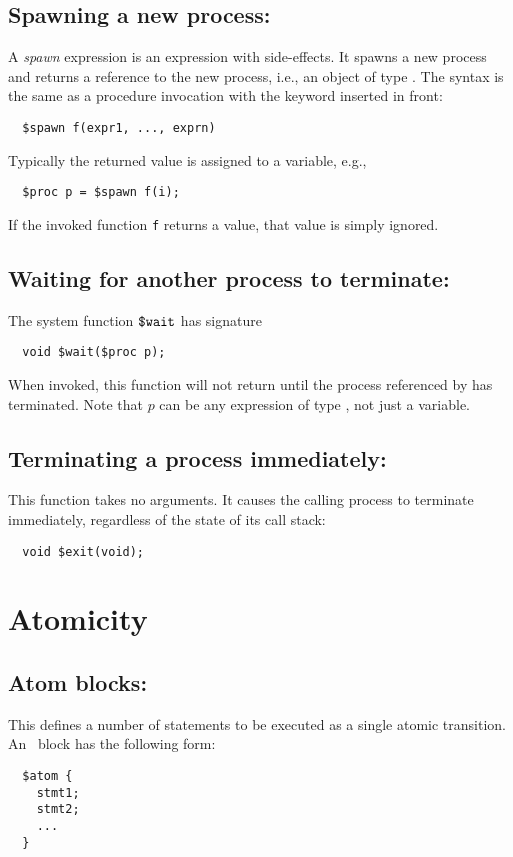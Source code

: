 \subsection{Spawning a new process: \cspawn}

A \emph{spawn} expression is an expression with side-effects.  It
spawns a new process and returns a reference to the new process, i.e.,
an object of type \cproc.  The syntax is the same as a procedure
invocation with the keyword \cspawn{} inserted in front:
\begin{verbatim}
  $spawn f(expr1, ..., exprn)
\end{verbatim}
Typically the returned value is assigned to a variable, e.g.,
\begin{verbatim}
  $proc p = $spawn f(i);
\end{verbatim}
If the invoked function \texttt{f} returns a value, that value is
simply ignored.

\subsection{Waiting for another process to terminate: \cwait}

The system function $\mbox{\texttt{\${}wait}}$ has signature
\begin{verbatim}
  void $wait($proc p);
\end{verbatim}
When invoked, this function will not return until the process
referenced by  has terminated. Note that $p$ can be any
expression of type \cproc{}, not just a variable.

\subsection{Terminating a process immediately: \cexit}

This function takes no arguments.  It causes the
calling process to terminate immediately, regardless of the state of
its call stack:
\begin{verbatim}
  void $exit(void);
\end{verbatim}

\section{Atomicity}

\subsection{Atom blocks: \catom} This defines a number of statements
to be executed as a single atomic transition.  An \catom~block has the
following form:
\begin{verbatim}
  $atom {
    stmt1;
    stmt2;
    ...
  }
\end{verbatim}

